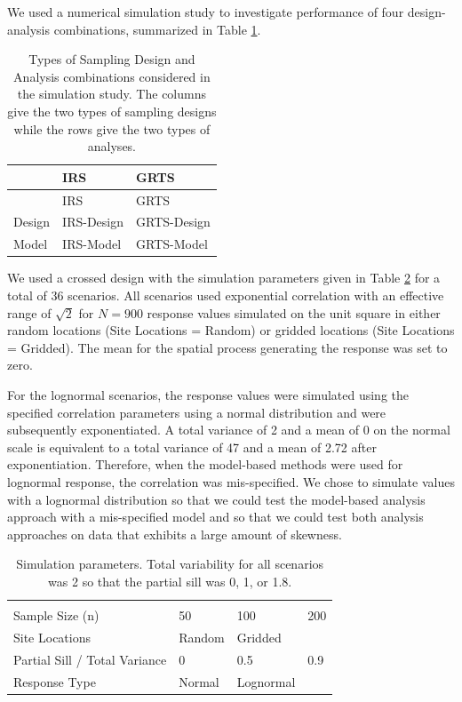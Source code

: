 \documentclass[]{elsarticle} %
\begin{document}
We used a numerical simulation study to investigate performance of four
design-analysis combinations, summarized in Table
\ref{tab:designanalysis}.

\begin{longtable}[]{@{}lll@{}}
\caption{\label{tab:designanalysis} Types of Sampling Design and
Analysis combinations considered in the simulation study. The columns
give the two types of sampling designs while the rows give the two types
of analyses.}\tabularnewline
\toprule
& IRS & GRTS \\
\midrule
\endfirsthead
\toprule
& IRS & GRTS \\
\midrule
\endhead
Design & IRS-Design & GRTS-Design \\
Model & IRS-Model & GRTS-Model \\
\bottomrule
\end{longtable}

We used a crossed design with the simulation parameters given in Table
\ref{tab:parmtab} for a total of 36 scenarios. All scenarios used
exponential correlation with an effective range of \(\sqrt{2}\) for
\(N = 900\) response values simulated on the unit square in either
random locations (Site Locations = Random) or gridded locations (Site
Locations = Gridded). The mean for the spatial process generating the
response was set to zero.

For the lognormal scenarios, the response values were simulated using
the specified correlation parameters using a normal distribution and
were subsequently exponentiated. A total variance of 2 and a mean of 0
on the normal scale is equivalent to a total variance of 47 and a mean
of 2.72 after exponentiation. Therefore, when the model-based methods
were used for lognormal response, the correlation was mis-specified. We
chose to simulate values with a lognormal distribution so that we could
test the model-based analysis approach with a mis-specified model and so
that we could test both analysis approaches on data that exhibits a
large amount of skewness.

\begin{longtable}[]{@{}llll@{}}
\caption{\label{tab:parmtab} Simulation parameters. Total variability
for all scenarios was 2 so that the partial sill was 0, 1, or
1.8.}\tabularnewline
\toprule
& & & \\
\midrule
\endfirsthead
\toprule
& & & \\
\midrule
\endhead
Sample Size (n) & 50 & 100 & 200 \\
Site Locations & Random & Gridded & \\
Partial Sill / Total Variance & 0 & 0.5 & 0.9 \\
Response Type & Normal & Lognormal & \\
\bottomrule
\end{longtable}
\end{document}
